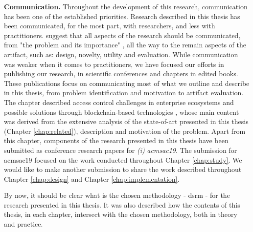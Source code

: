 \textbf{Communication.} Throughout the development of this research, communication has been one of the established priorities. Research described in this thesis has been communicated, for the most part, with researchers, and less with practitioners. \citeauthor{peffers_design_2007} \cite{peffers_design_2007} suggest that all aspects of the research should be communicated, from "the problem and its importance" \cite[14]{peffers_design_2007}, all the way to the remain aspects of the artifact, such as: design, novelty, utility and evaluation. While communication was weaker when it comes to practitioners, we have focused our efforts in publishing our research, in scientific conferences and chapters in edited books. These publications focus on communicating most of what we outline and describe in this thesis, from problem identification and motivation to artifact evaluation. The chapter described access control challenges in enterprise ecosystems and possible solutions through blockchain-based technologies \cite{bryan_christiansen_access_2018}, whose main content was derived from the extensive analysis of the state-of-art presented in this thesis (Chapter \ref{chap:related}), description and motivation of the problem. Apart from this chapter, components of the research presented in this thesis have been submitted as conference research papers for \emph{(i)} \textit{\gls{acmsac19}}. The submission for \gls{acmsac19} focused on the work conducted throughout Chapter \ref{chap:study}. We would like to make another submission to share the work described throughout Chapter \ref{chap:design} and Chapter \ref{chap:implementation}.

By now, it should be clear what is the chosen methodology - \glsdesc{dsrm} \cite{peffers_design_2007} - for the research presented in this thesis. It was also described how the contents of this thesis, in each chapter, intersect with the chosen methodology, both in theory and practice.